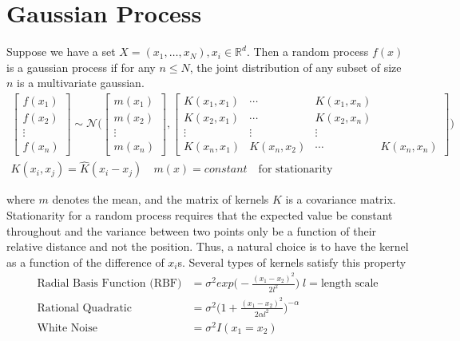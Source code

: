 \documentclass[../../statistical_learning_notes.tex]{subfiles}
\begin{document}
\section{Gaussian Process}
Suppose we have a set $X = (x_{1}, \ldots, x_{N}), x_{i} \in \mathbb{R}^{d}$. Then a random process $f(x)$ is a gaussian process if for any $n \leq N$, the joint distribution of any subset of size $n$ is a multivariate gaussian.
\begin{align*}
    \begin{bmatrix} f(x_{1})\\ f(x_{2})\\ \vdots\\ f(x_{n}) \end{bmatrix} \sim \mathcal{N} \bigg( \begin{bmatrix} m(x_{1})\\ m(x_{2})\\ \vdots\\ m(x_{n}) \end{bmatrix}, \begin{bmatrix} K(x_{1}, x_{1}) &\cdots &K(x_{1}, x_{n})\\ K(x_{2}, x_{1}) &\cdots &K(x_{2}, x_{n})\\ \vdots &\vdots &\vdots\\ K(x_{n}, x_{1}) &K(x_{n}, x_{2}) &\cdots &K(x_{n}, x_{n}) \end{bmatrix}  \bigg)\\
    K(x_{i}, x_{j}) = \hat{K}(x_{i} - x_{j}) \quad m(x) = constant \quad \text{for stationarity}
\end{align*}

where $m$ denotes the mean, and the matrix of kernels $K$ is a covariance matrix. Stationarity for a random process requires that the expected value be constant throughout and the variance between two points only be a function of their relative distance and not the position. Thus, a natural choice is to have the kernel as a function of the difference of $x_{i}$s. Several types of kernels satisfy this property
\begin{align*}
    \text{Radial Basis Function (RBF)} &= \sigma^{2}exp \bigg( -\frac{(x_{1} - x_{2})^{2}}{2l^{2}} \bigg) \; l = \text{length scale}\\
    \text{Rational Quadratic} &= \sigma^{2}\bigg(1 +\frac{(x_{1} - x_{2})^{2}}{2\alpha l^{2}} \bigg)^{-\alpha}\\
    \text{White Noise} &= \sigma^{2}I(x_{1} = x_{2})
\end{align*}
\end{document}
